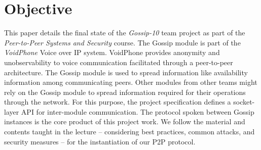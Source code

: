 \section{Objective}\label{sec:objective2}

This paper details the final state of the \textit{Gossip-10} team project as part of the
\textit{Peer-to-Peer Systems and Security} course.
The Gossip module is part of the \textit{VoidPhone} Voice over IP system.
VoidPhone provides anonymity and unobservability to voice communication facilitated through a peer-to-peer architecture.
The Gossip module is used to spread information like availability information among communicating peers.
Other modules from other teams might rely on the Gossip module to spread information required for their operations
through the network.
For this purpose, the project specification defines a socket-layer API for inter-module communication.
The protocol spoken between Gossip instances is the core product of this project work.
We follow the material and contents taught in the lecture -- considering best practices, common attacks, and security measures --
for the instantiation of our P2P protocol.
